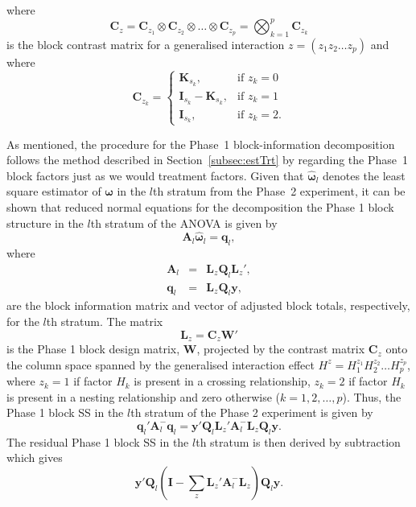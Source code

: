 \documentclass[article]{jss}
\newcommand{\I}{\mathbf{I}}
\newcommand{\K}{\mathbf{K}}
\newcommand{\Q}{\mathbf{Q}}
\newcommand{\A}{\mathbf{A}}
\newcommand{\C}{\mathbf{C}}
\newcommand{\mL}{\mathbf{L}}
\newcommand{\W}{\mathbf{W}}
\begin{document}
where 
\[
\C_{z} =  \C_{z_1} \otimes  \C_{z_2} \otimes \dots \otimes  \C_{z_{p}} = \bigotimes^{p} _{k = 1} \C_{z_k}
\]
is the block contrast matrix for a generalised interaction $z = (z_1 z_2 \dots z_{p})$ and where 
\begin{equation}
\label{eq:contrMat1}
\C_{z_k} =
   \begin{cases}
       \K_{s_k}, & \mbox{if } z_k = 0 \\
       \I_{s_k} - \K_{s_k}, & \mbox{if } z_k = 1\\
        \I_{s_k}, & \mbox{if } z_k = 2.
    \end{cases}
\end{equation}

As mentioned, the procedure for the Phase~1 block-information decomposition follows the method described in Section~\ref{subsec:estTrt} by regarding the Phase~1 block factors just as we would treatment factors. Given that $\hat{\bm{\omega}}_{l}$ denotes the least square estimator of $\bm{\omega}$ in the $l$th stratum from the Phase~2 experiment, it can be shown that reduced normal equations for the decomposition the Phase 1 block structure in the $l$th stratum of the ANOVA is given by 
\begin{equation}\label{eq:blkReducedNormal}
\A_{l} \hat{\bm{\omega}}_{l} = \bm{q}_{l},
\end{equation}
where
\begin{eqnarray*}
\A_l &=& \mL_{z}\Q_l\mL_{z}',\\
\bm{q}_l &=& \mL_{z}\Q_l \bm{y},
\end{eqnarray*}
are the block information matrix and vector of adjusted block totals, respectively, for the $l$th stratum. The matrix 
\[
 \mL_{z} = \C_z \W'
\]
is the Phase 1 block design matrix, $\W$, projected by the contrast matrix $\C_z$ onto the column space spanned by the generalised interaction effect $H^{z} = H^{z_1}_1  H^{z_2}_2 \dots  H^{z_p}_p$, where $z_k = 1$ if factor $H_k$ is present in a crossing relationship, $z_k = 2$ if factor $H_k$ is present in a nesting relationship and zero otherwise ($k = 1,2, \dots, p$). Thus, the Phase 1 block SS in the $l$th stratum of the Phase 2 experiment is given by 
\begin{equation}\label{eq:blkSS}
 \bm{q}_{l}' \A_{l}^{-} \bm{q}_{l} = \bm{y}'\Q_l\mL_{z}' \A_{l}^{-} \mL_{z} \Q_l\bm{y}.
\end{equation}
The residual Phase 1 block SS in the $l$th stratum is then derived by subtraction which gives 
\[
\bm{y}'\Q_l(\I - \sum_z \mL_{z}' \A_{l}^{-} \mL_{z}) \Q_l\bm{y}. 
\]
\end{document}
